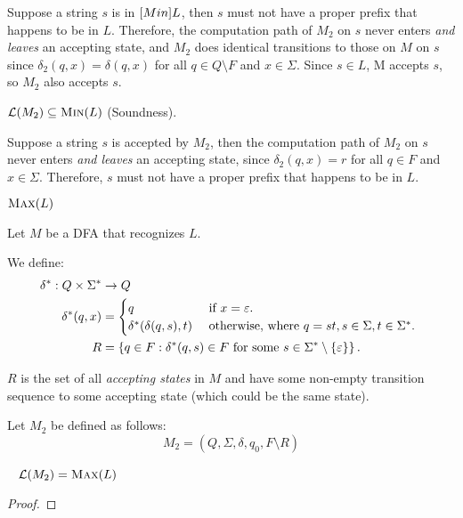 \begin{problem}
\begin{Answer}
\begin{enumalph}
\begin{enumroman}
            Suppose a string $s$ is in $\textsc[Min]{L}$,
            then $s$ must not have a proper prefix that happens to be in $L$.
            Therefore, the computation path of $M_2$ on $s$ never enters \emph{and leaves} an accepting state,
            and $M_2$ does identical transitions to those on $M$ on $s$
            since $\delta_2(q, x) = \delta(q, x)$ for all $q \in Q \setminus F$ and $x \in \Sigma$.
            Since $s \in L$, M accepts $s$, so $M_2$ also accepts $s$.
          \item $\mathcal{L}(M_2) \subseteq \textsc{Min}(L)$ (Soundness).
          
            Suppose a string $s$ is accepted by $M_2$,
            then the computation path of $M_2$ on $s$ never enters \emph{and leaves} an accepting state,
            since $\delta_2(q, x) = r$ for all $q \in F$ and $x \in \Sigma$.
            Therefore, $s$ must not have a proper prefix that happens to be in $L$.
        \end{enumroman}
      \item $\textsc{Max}(L)$
      
      \step
      Let $M$ be a DFA that recognizes $L$.

      We define:
      \begin{align*}
        \delta^* : Q \times \Sigma^* &\to Q \\
        \delta^*(q, x) &= \begin{cases}
          q &\text{ if $x = \varepsilon$. }\\
          \delta^*(\delta(q, s), t) &\text{ otherwise, where $q = st, s \in \Sigma, t \in \Sigma^*$. } \\
        \end{cases}\\
        R &= \left\{q \in F : \delta^*(q, s) \in F \text{ for some } s \in \Sigma^* \setminus \left\{\varepsilon\right\}\right\}.
      \end{align*}
      \begin{observation}
        $R$ is the set of all \emph{accepting states} in $M$
        and have some non-empty transition sequence to some accepting state
        (which could be the same state).
      \end{observation}

      \step
      Let $M_2$ be defined as follows:
      \[ M_2 = (Q, \Sigma, \delta, q_0, F \setminus R)\]
      \begin{claim}~\label{claim:Max}
        $\mathcal{L}(M_2) = \textsc{Max}(L)$
        \begin{proof}


\end{proof}
\end{claim}
\end{enumalph}
\end{Answer}
\end{problem}

